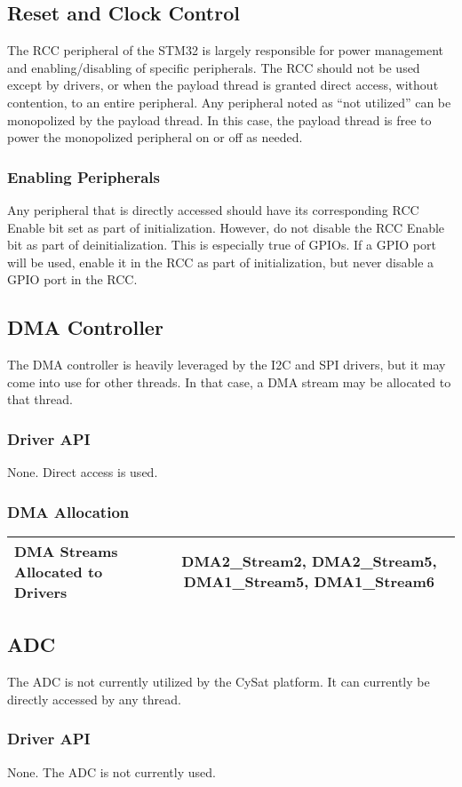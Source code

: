 \documentclass{article}
\begin{document}
\subsection{Reset and Clock Control}
The RCC peripheral of the STM32 is largely responsible for power management
and enabling/disabling of specific peripherals. The RCC should not be used except
by drivers, or when the payload thread is granted direct access, without contention,
to an entire peripheral. Any peripheral noted as ``not utilized'' can
be monopolized by the payload thread. In this case, the payload thread is free to
power the monopolized peripheral on or off as needed.
\subsubsection{Enabling Peripherals}
Any peripheral that is directly accessed should have its corresponding 
RCC Enable bit set as part of initialization. However, do not disable
the RCC Enable bit as part of deinitialization. This is especially
true of GPIOs. If a GPIO port will be used, enable it in the
RCC as part of initialization, but never disable a GPIO port in
the RCC.

\subsection{DMA Controller}
The DMA controller is heavily leveraged by the I2C and SPI drivers, but it may
come into use for other threads. In that case, a DMA stream may be allocated
to that thread.
\subsubsection{Driver API}
None. Direct access is used.
\subsubsection{DMA Allocation}
\begin{tabular}{| l | c |}
    \hline 
    DMA Streams Allocated to Drivers & DMA2_Stream2, DMA2_Stream5, DMA1_Stream5, DMA1_Stream6\\ \hline
\end{tabular}

\subsection{ADC}
The ADC is not currently utilized by the CySat platform. It can currently be directly
accessed by any thread.
\subsubsection{Driver API}
None. The ADC is not currently used.
\end{document}
